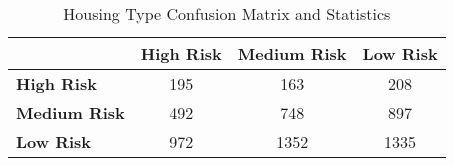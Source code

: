 \begin{table}[!htbp]
    \small
    \centering
    \caption{Housing Type Confusion Matrix and Statistics}
    \label{tab:hh_type_confusion}
    \begin{tabular}{lccc}
        \toprule
        & \textbf{High Risk} & \textbf{Medium Risk} & \textbf{Low Risk} \\
        \midrule
        \textbf{High Risk} & 195 & 163 & 208 \\
        \textbf{Medium Risk} & 492 & 748 & 897 \\
        \textbf{Low Risk} & 972 & 1352 & 1335 \\
        \bottomrule

    \end{tabular}
\end{table}